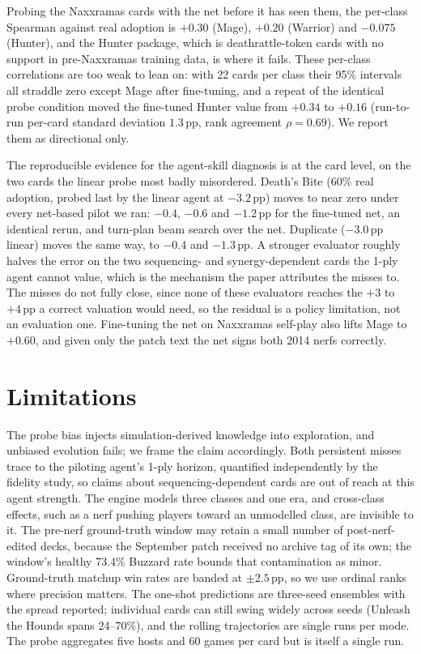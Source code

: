 \documentclass[conference]{IEEEtran}
\newcommand{\pp}{\,\text{pp}}
\begin{document}
Probing the Naxxramas cards with the net before it has seen them,
the per-class Spearman against real adoption is $+0.30$ (Mage),
$+0.20$ (Warrior) and $-0.075$ (Hunter), and the Hunter package,
which is deathrattle-token cards with no support in pre-Naxxramas
training data, is where it fails. These per-class correlations are
too weak to lean on: with 22 cards per class their 95\% intervals
all straddle zero except Mage after fine-tuning, and a repeat of the
identical probe condition moved the fine-tuned Hunter value from
$+0.34$ to $+0.16$ (run-to-run per-card standard deviation
$1.3\pp$, rank agreement $\rho=0.69$). We report them as directional
only.

The reproducible evidence for the agent-skill diagnosis is at the
card level, on the two cards the linear probe most badly misordered.
Death's Bite (60\% real adoption, probed last by the linear agent at
$-3.2\pp$) moves to near zero under every net-based pilot we ran:
$-0.4$, $-0.6$ and $-1.2\pp$ for the fine-tuned net, an identical
rerun, and turn-plan beam search over the net. Duplicate ($-3.0\pp$
linear) moves the same way, to $-0.4$ and $-1.3\pp$. A stronger
evaluator roughly halves the error on the two sequencing- and
synergy-dependent cards the 1-ply agent cannot value, which is the
mechanism the paper attributes the misses to. The misses do not
fully close, since none of these evaluators reaches the $+3$ to
$+4\pp$ a correct valuation would need, so the residual is a policy
limitation, not an evaluation one. Fine-tuning the net on Naxxramas
self-play also lifts Mage to $+0.60$, and given only the patch text
the net signs both 2014 nerfs correctly.

\section{Limitations}
\label{sec:limitations}

The probe bias injects simulation-derived knowledge into
exploration, and unbiased evolution fails; we frame the claim
accordingly. Both persistent misses trace to the piloting agent's
1-ply horizon, quantified independently by the fidelity study, so
claims about sequencing-dependent cards are out of reach at this
agent strength. The engine models three classes and one era, and
cross-class effects, such as a nerf pushing players toward an
unmodelled class, are invisible to it. The pre-nerf ground-truth
window may retain a small number of post-nerf-edited decks, because
the September patch received no archive tag of its own; the
window's healthy 73.4\% Buzzard rate bounds that contamination as
minor. Ground-truth matchup win rates are banded at $\pm2.5\pp$,
so we use ordinal ranks where precision matters. The one-shot
predictions are three-seed ensembles with the spread reported;
individual cards can still swing widely across seeds (Unleash the
Hounds spans 24--70\%), and the rolling trajectories are single
runs per mode. The probe aggregates five hosts and 60 games per
card but is itself a single run.
\end{document}
